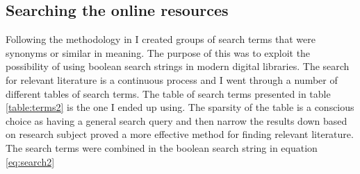 \documentclass[a4paper]{book}
\begin{document}
\begin{appendices}
\subsection{Searching the online resources }
Following the methodology in \cite{oates_researching_2005} I created groups of search terms that were synonyms or similar in meaning. The purpose of this was to exploit the possibility of using boolean search strings in modern digital libraries. 
The search for relevant literature is a continuous process and I went through a number of different tables of search terms. 
The table of search terms presented in table \ref{table:terms2} is the one I ended up using. The sparsity of the table is a conscious choice as having a general search query and then narrow the results down based on research subject proved a more effective method for finding relevant literature.
The search terms were combined in the boolean search string in equation \ref{eq:search2}
			\begin{table}[htdp]
			\begin{center}

\end{center}
\end{table}
\end{appendices}
\end{document}
